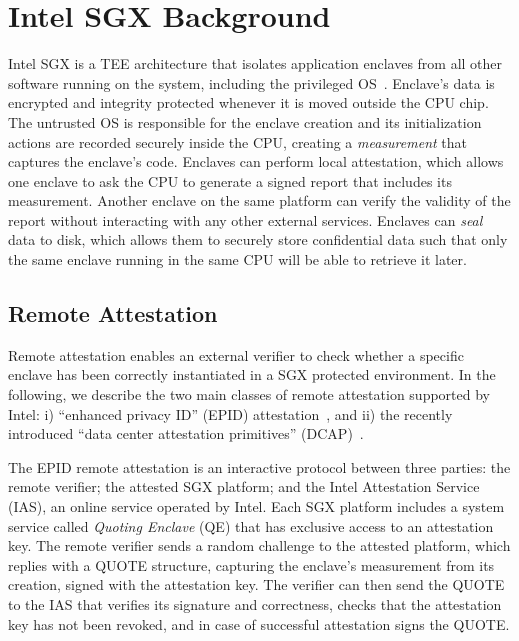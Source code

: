 \section{Intel SGX Background}
\label{ch:background:SGX}

Intel SGX is a TEE architecture that isolates application enclaves from all other software running on the system, including the privileged OS~\cite{sgxexplained}. Enclave's data is encrypted and integrity protected whenever it is moved outside the CPU chip. The untrusted OS is responsible for the enclave creation and its initialization actions are recorded securely inside the CPU, creating a \emph{measurement} that captures the enclave's code. Enclaves can perform local attestation, which allows one enclave to ask the CPU to generate a signed report that includes its measurement. Another enclave on the same platform can verify the validity of the report without interacting with any other external services. Enclaves can \emph{seal} data to disk, which  allows them to securely store confidential data such  that only the same enclave running in the same CPU will be able to retrieve it later.


\subsection{Remote Attestation}
\label{sec:background:attestation}

Remote attestation enables an external verifier to check whether a specific enclave has been correctly instantiated in a SGX protected environment. In the following, we describe the two main classes of remote attestation supported by Intel: i) ``enhanced privacy ID'' (EPID) attestation~\cite{epid_attestation}, and ii) the recently introduced ``data center attestation primitives'' (DCAP)~\cite{DCAP}.

The EPID remote attestation is an interactive protocol between three parties: the remote verifier; the attested SGX platform; and the Intel Attestation Service (IAS), an online service operated by Intel. 
Each SGX platform includes a system service called \emph{Quoting Enclave} (QE) that has exclusive access to an attestation key. The remote verifier sends a random challenge to the attested platform, which replies with a QUOTE structure, capturing the enclave's measurement from its creation, signed with the attestation key. The verifier can then send the QUOTE to the IAS that verifies its signature and correctness, checks that the attestation key has not been revoked, and in case of successful attestation signs the QUOTE. 

